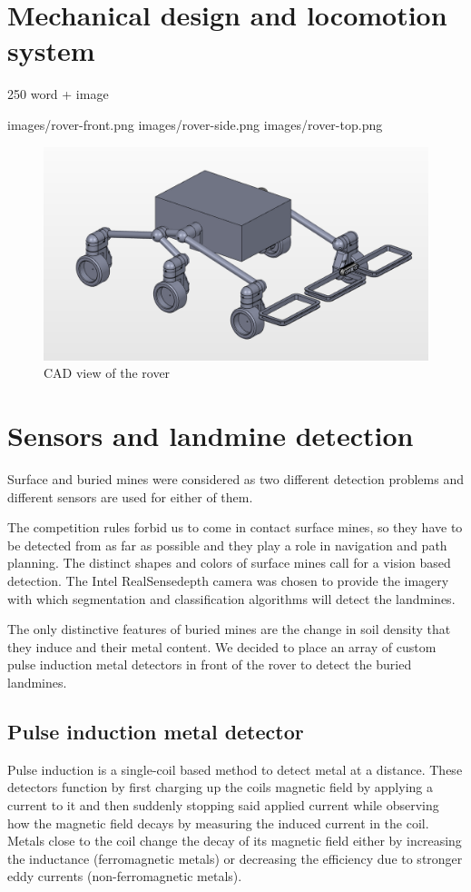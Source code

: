 \section{Mechanical design and locomotion system}
250 word + image

images/rover-front.png
images/rover-side.png
images/rover-top.png

\begin{figure}[htbp]
   \caption{\label{fig:rover} CAD view of the rover}
   \includegraphics[width=\textwidth]{images/rover}
\end{figure}

\section{Sensors and landmine detection}
Surface and buried mines were considered as two different detection problems and different sensors are used for either of them.

The competition rules forbid us to come in contact surface mines, so they have to be detected from as far as possible and they play a role in navigation and path planning.
The distinct shapes and colors of surface mines call for a vision based detection.
The Intel RealSense\texttrademark depth camera was chosen to provide the imagery with which segmentation and classification algorithms will detect the landmines.

The only distinctive features of buried mines are the change in soil density that they induce and their metal content.
We decided to place an array of custom pulse induction metal detectors in front of the rover to detect the buried landmines.

\subsection{Pulse induction metal detector}
Pulse induction is a single-coil based method to detect metal at a distance.
These detectors function by first charging up the coils magnetic field by applying a current to it and then suddenly stopping said applied current while observing how the magnetic field decays by measuring the induced current in the coil.
Metals close to the coil change the decay of its magnetic field either by increasing the inductance (ferromagnetic metals) or decreasing the efficiency due to stronger eddy currents (non-ferromagnetic metals).

